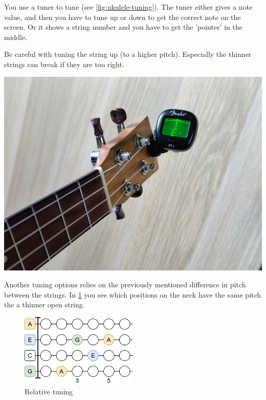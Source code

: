 \begin{minipage}{0.5\textwidth}
You use a tuner to tune (see \ref{fig:ukulele-tuning}). The tuner either gives a note value, and then you have to tune up or down to get the correct note on the screen. Or it shows a string number and you have to get the 'pointer' in the middle.

Be careful with tuning the string up (to a higher pitch). Especially the thinner strings can break if they are too right.
\end{minipage}
\hfill
\begin{minipage}{0.35\textwidth}
	\centering
	\includegraphics[width=\textwidth]{../../Images/ukulele-tuning.jpg}
	\label{fig:ukulele-tuning}
\end{minipage}

Another tuning options relies on the previously mentioned difference in pitch between the strings. In \ref{fig:ukulele_relative_tuning} you see which positions on the neck have the same pitch the a thinner open string.

\begin{figure}[h]
	\centering
	\includegraphics[width=0.5\textwidth]{../../Images/UkuleleRelativeTuning.png}
	\caption{Relative tuning}
	\label{fig:ukulele_relative_tuning}
\end{figure}
